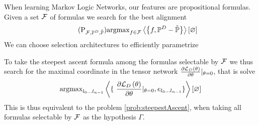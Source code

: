 



When learning Markov Logic Networks, our features are propositional formulas.
Given a set $\mathcal{F}$ of formulas we search for the best alignment 
\begin{align}\label{prob:steepestAscent}\tag{$\mathrm{P}_{\formulaset,\empdistribution,\currentdistribution}$}
	\argmax_{\formula\in\formulaset} \sbcontraction{\formula,\empdistribution-\currentdistribution}
\end{align}
We can choose selection architectures to efficiently parametrize 




%
To take the steepest ascent formula among the formulas selectable by $\mathcal{F}$ we thus search for the maximal coordinate in the tensor network $\frac{\partial \mathcal{L}_{D}\left(\theta\right)}{\partial \theta}|_{\theta=0}$, that is solve
\begin{align}
	\argmax_{\parindices} \contractionof{
	\{ \frac{\partial \lossof{\theta}}{\partial \parametercore}|_{\parametercore=0} , \onehotmapof{\parindices} \}
	}{\varnothing}
\end{align}
This is thus equivalent to the problem \ref{prob:steepestAscent}, when taking all formulas selectable by $\mathcal{F}$ as the hypothesis $\Gamma$.


